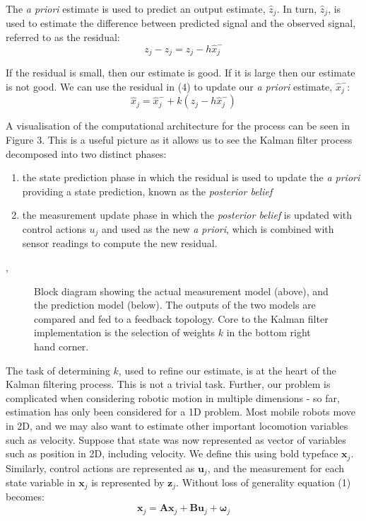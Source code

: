 \documentclass[a4paper]{article}
\begin{document}
The \textit{a priori} estimate is used to predict an output estimate,  $\hat{z}_j$. In turn, $\hat{z}_j$, is used to estimate the difference between predicted signal and the observed signal, referred to as the residual:
\begin{equation}
z_j - \hat{z}_j = z_j - h \hat{x}^-_j
\end{equation}

If the residual is small, then our estimate is good. If it is large then our estimate is not good. We can use the residual in (4) to update our \textit{a priori} estimate, $\hat{x}^-_j$:
\begin{equation}
\hat{x}_j = \hat{x}^-_j + k (z_j - h \hat{x}^-_j)
\end{equation}

A visualisation of the computational architecture for the process can be seen in Figure 3. This is a useful picture as it allows us to see the Kalman filter process decomposed into two distinct phases:
\begin{enumerate}
\item the state prediction phase in which the residual is used to update the \textit{a priori} providing a state prediction, known as the \textit{posterior belief}
\item the measurement update phase in which the \textit{posterior belief} is updated with control actions $u_j$ and used as the new \textit{a priori}, which is combined with sensor readings to compute the new residual.
\end{enumerate}, 
\begin{figure}[h]
\centering

\caption{Block diagram showing the actual measurement model (above), and the prediction model (below). The outputs of the two models are compared and fed to a feedback topology. Core to the Kalman filter implementation is the selection of weights $k$ in the bottom right hand corner.}
\end{figure}

The task of determining $k$, used to refine our estimate, is at the heart of the Kalman filtering process. This is not a trivial task. Further, our problem is complicated when considering robotic motion in multiple dimensions - so far, estimation has only been considered for a 1D problem. Most mobile robots move in 2D, and we may also want to estimate other important locomotion variables such as velocity. Suppose that state was now represented as vector of variables such as position in 2D, including velocity. We define this using bold typeface $\mathbf{x}_j$. Similarly, control actions are represented as $\mathbf{u}_j$, and the measurement for each state variable in $\mathbf{x}_j$ is represented by $\mathbf{z}_j$. Without loss of generality equation (1) becomes:
\begin{equation}
\mathbf{x}_j = \mathbf{A} \mathbf{x}_j + \mathbf{B} \mathbf{u}_j + \boldsymbol{\omega}_j
\end{equation}
\end{document}
